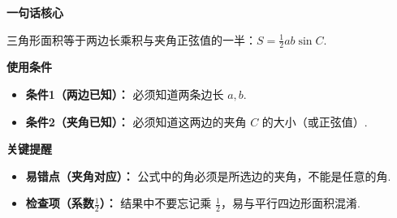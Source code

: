 \begin{summarybox}
	\textbf{\textcolor{CSummary}{一句话核心}}

	三角形面积等于两边长乘积与夹角正弦值的一半：$\displaystyle S=\frac12ab\sin C$.

	\medskip
	\textbf{\textcolor{CSummary}{使用条件}}
	\begin{itemize}[leftmargin=*, itemsep=0.5em, topsep=0.4em]
		\item \textbf{条件1（两边已知）：} 必须知道两条边长 $a,b$.
		\item \textbf{条件2（夹角已知）：} 必须知道这两边的夹角 $C$ 的大小（或正弦值）.
	\end{itemize}

	\medskip
	\textbf{\textcolor{CSummary}{关键提醒}}
	\begin{itemize}[leftmargin=*, itemsep=0.5em, topsep=0.4em]
		\item \textbf{易错点（夹角对应）：} 公式中的角必须是所选边的夹角，不能是任意的角.
		\item \textbf{检查项（系数$\frac12$）：} 结果中不要忘记乘 $\frac12$，易与平行四边形面积混淆.
	\end{itemize}
\end{summarybox}
